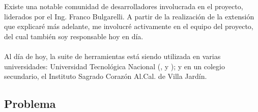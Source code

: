 Existe una notable comunidad de desarrolladores involucrada en el proyecto, liderados por el Ing. Franco Bulgarelli. A partir de la realización de la extensión que explicaré más adelante, me involucré activamente en el equipo del proyecto, del cual también soy responsable hoy en día.
\\\\
Al día de hoy, la suite de herramientas está siendo utilizada en varias universidades: Universidad Tecnológica Nacional (,  y ); y en un colegio secundario, el Instituto Sagrado Corazón Al.Cal. de Villa Jardín.

\subsection{Problema}
